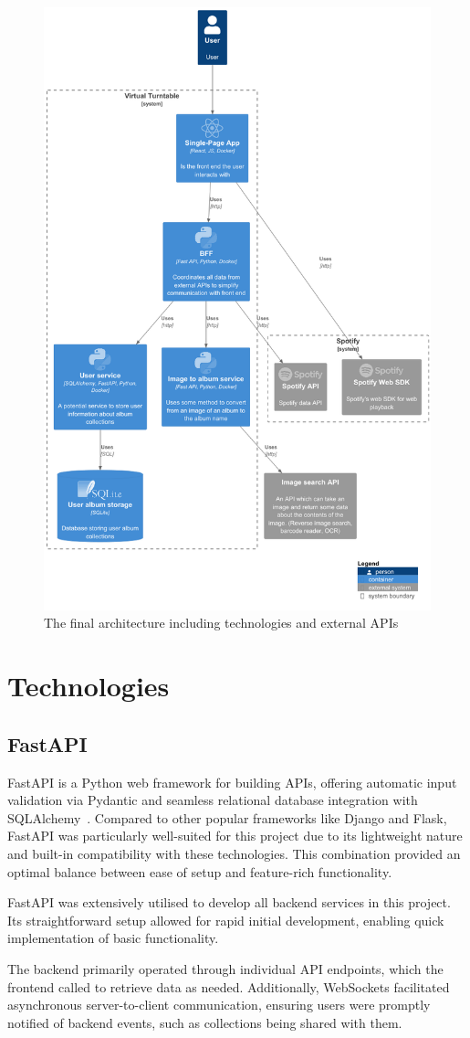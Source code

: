 \begin{figure} [H]
    \centering
    \includegraphics[width=0.5\linewidth]{figures/final_arch.png}
    \caption{The final architecture including technologies and external APIs}
    \label{fig:final-arch}
\end{figure}


\section{Technologies}
\subsection{FastAPI}
FastAPI is a Python web framework for building APIs, offering automatic input validation via Pydantic and seamless relational database integration with SQLAlchemy~\cite{FastAPI}. Compared to other popular frameworks like Django and Flask, FastAPI was particularly well-suited for this project due to its lightweight nature and built-in compatibility with these technologies. This combination provided an optimal balance between ease of setup and feature-rich functionality.

FastAPI was extensively utilised to develop all backend services in this project. Its straightforward setup allowed for rapid initial development, enabling quick implementation of basic functionality.

The backend primarily operated through individual API endpoints, which the frontend called to retrieve data as needed. Additionally, WebSockets facilitated asynchronous server-to-client communication, ensuring users were promptly notified of backend events, such as collections being shared with them.

